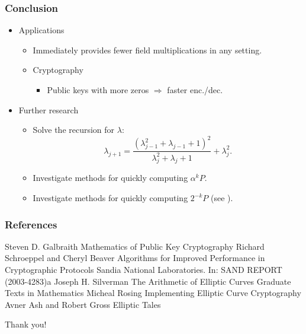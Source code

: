 \documentclass[xcolor=pdftex,dvipsnames,table]{beamer}
\theoremstyle{plain}
\theoremstyle{definition}
\newcommand{\paren}[1]{\left( #1 \right)}
\begin{document}
\begin{frame}
	\frametitle{Conclusion}
	\begin{itemize}
		\item Applications
		\begin{itemize}
			\item Immediately provides fewer field multiplications in any setting.
			\item Cryptography
			\begin{itemize}
				\item Public keys with more zeros $\Rightarrow$ faster enc./dec.
			\end{itemize}
		\end{itemize}
		\item Further research
		\begin{itemize}
			\item Solve the recursion for $\lambda$:
			\[
			\lambda_{j+1}=\frac{\paren{\lambda_{j-1}^2+\lambda_{j-1}+1}^2}{\lambda_{j}^2+\lambda_{j}+1}+\lambda_{j}^2.
			\]
			
			\item Investigate methods for quickly computing $\alpha^kP$.
			
			\item Investigate methods for quickly computing $2^{-k}P$ (see \cite{ECDSA}).
		\end{itemize}
	\end{itemize}
	
\end{frame}

\begin{frame}[allowframebreaks]
\frametitle{References}
\begin{thebibliography}{10}    
		Steven D. Galbraith
		\newblock Mathematics of Public Key Cryptography
		Richard Schroeppel and Cheryl Beaver
		\newblock Algorithms for Improved Performance in Cryptographic Protocols
		\newblock Sandia National Laboratories. In: SAND REPORT (2003-4283)a
		Joseph H. Silverman
		\newblock The Arithmetic of Elliptic Curves
		\newblock Graduate Texts in Mathematics
		Micheal Rosing
		\newblock Implementing Elliptic Curve Cryptography
		Avner {Ash} and Robert {Gross}
		\newblock Elliptic Tales
\end{thebibliography}
\end{frame}

\begin{frame}
\begin{Large}
\begin{center}
Thank you!
\end{center}
\end{Large}
\end{frame}
\end{document}
